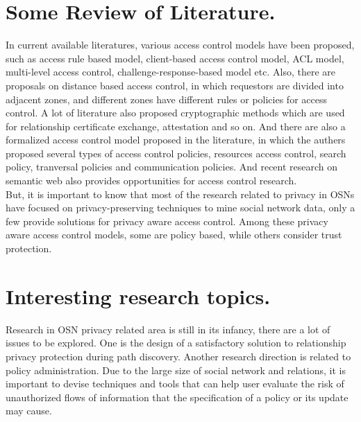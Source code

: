 \documentclass[24pt]{article}
\begin{document}
\section*{Some Review of Literature.}
In current available literatures, various access control models have
been proposed, such as access rule based model, client-based access
control model, ACL model, multi-level access control,
challenge-response-based model etc. 
Also, there are proposals on distance based access control, in which
requestors are divided into adjacent zones, and different zones have
different rules or policies for access control. 
A lot of literature also proposed cryptographic methods which are used
for relationship certificate exchange, attestation and so on. And there
are also a formalized access control model proposed in the literature,
in which the authers proposed several types of access control
policies, resources access control, search policy, tranversal policies
and communication policies. And recent research on semantic web also
provides opportunities for access control research. \\

But, it is important to know that most of the research related to
privacy in OSNs have focused on privacy-preserving techniques to mine
social network data, only a few provide solutions for privacy aware
access control. Among these privacy aware access control models, some
are policy based, while others consider trust protection. 

\section*{Interesting research topics.}
Research in OSN privacy related area is still in its infancy, there
are a lot of issues to be explored. One is the design of a
satisfactory solution to relationship privacy protection during path
discovery. Another research direction is related to policy
administration. Due to the large size of social network and relations,
it is important to devise techniques and tools that can help user
evaluate the risk of unauthorized flows of information that the
specification of a policy or its update may cause.
\end{document}
